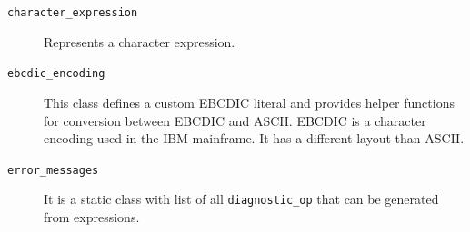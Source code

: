 \begin{description}
	\item[\texttt{character\_expression}] Represents a character expression.
	
	\item[\texttt{ebcdic\_encoding}] This class defines a custom EBCDIC literal and provides helper functions for conversion between EBCDIC and ASCII. EBCDIC is a character encoding used in the IBM mainframe. It has a different layout than ASCII.
	
	\item[\texttt{error\_messages}] It is a static class with list of all \texttt{diagnostic\_op} that can be generated from expressions.
	
	
\end{description}

